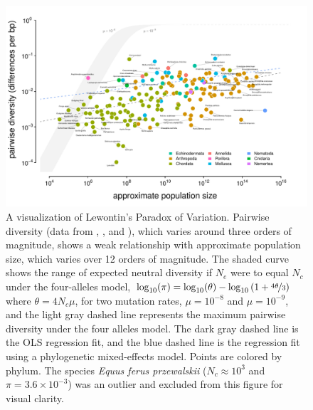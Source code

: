 \documentclass[9pt,lineno]{elife}
\newcommand{\logt}{\log_{10}}
\begin{document}
\begin{figure}
  \begin{fullwidth}
  \includegraphics[width=\linewidth]{diversity_popsize_full.pdf}

  \caption{A visualization of Lewontin's Paradox of Variation. Pairwise
    diversity (data from \cite{Leffler2012-zj}, \cite{Corbett-Detig2015-gt},
    and \cite{Romiguier2014-bp}), which varies around three orders of
    magnitude, shows a weak relationship with approximate population size,
    which varies over 12 orders of magnitude.  The shaded curve shows the range
    of expected neutral diversity if $N_e$ were to equal $N_c$ under the
    four-alleles model, $\log_{10}(\pi) = \logt(\theta) - \logt{(1 +
    \nicefrac{4\theta}{3})}$ where $\theta = 4N_c \mu$, for two mutation rates,
    $\mu = 10^{-8}$ and $\mu = 10^{-9}$, and the light gray dashed line
    represents the maximum pairwise diversity under the four alleles model. The
    dark gray dashed line is the OLS regression fit, and the blue dashed line
    is the regression fit using a phylogenetic mixed-effects model.  Points are
    colored by phylum. The species \emph{Equus ferus przewalskii} ($N_c \approx
    10^3$ and $\pi = 3.6 \times 10^{-3}$) was an outlier and excluded from this
    figure for visual clarity.}\label{fig:pi-Nc}


\end{fullwidth}
\end{figure}
\end{document}
